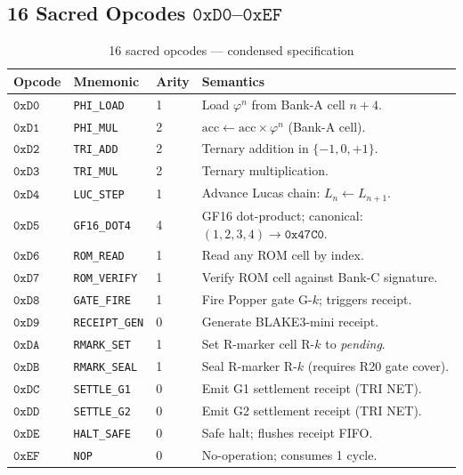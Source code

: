 \subsection{16 Sacred Opcodes $\mathtt{0xD0}$--$\mathtt{0xEF}$}
\label{sec74:opcodes}

\begin{table}[H]
\centering
\caption{16 sacred opcodes — condensed specification}
\label{tab74:opcodes}
\small
\begin{tabular}{lllp{6cm}}
\toprule
Opcode & Mnemonic & Arity & Semantics \\
\midrule
$\mathtt{0xD0}$ & \texttt{PHI\_LOAD}    & 1 & Load $\varphi^{n}$ from Bank-A cell $n+4$. \\
$\mathtt{0xD1}$ & \texttt{PHI\_MUL}     & 2 & $\mathrm{acc} \leftarrow \mathrm{acc} \times \varphi^{n}$ (Bank-A cell). \\
$\mathtt{0xD2}$ & \texttt{TRI\_ADD}     & 2 & Ternary addition in $\{-1,0,+1\}$. \\
$\mathtt{0xD3}$ & \texttt{TRI\_MUL}     & 2 & Ternary multiplication. \\
$\mathtt{0xD4}$ & \texttt{LUC\_STEP}    & 1 & Advance Lucas chain: $L_n \leftarrow L_{n+1}$. \\
$\mathtt{0xD5}$ & \texttt{GF16\_DOT4}   & 4 & GF16 dot-product; canonical: $(1,2,3,4)\to\mathtt{0x47C0}$. \\
$\mathtt{0xD6}$ & \texttt{ROM\_READ}    & 1 & Read any ROM cell by index. \\
$\mathtt{0xD7}$ & \texttt{ROM\_VERIFY}  & 1 & Verify ROM cell against Bank-C signature. \\
$\mathtt{0xD8}$ & \texttt{GATE\_FIRE}   & 1 & Fire Popper gate G-$k$; triggers receipt. \\
$\mathtt{0xD9}$ & \texttt{RECEIPT\_GEN} & 0 & Generate BLAKE3-mini receipt. \\
$\mathtt{0xDA}$ & \texttt{RMARK\_SET}   & 1 & Set R-marker cell R-$k$ to \textit{pending}. \\
$\mathtt{0xDB}$ & \texttt{RMARK\_SEAL}  & 1 & Seal R-marker R-$k$ (requires R20 gate cover). \\
$\mathtt{0xDC}$ & \texttt{SETTLE\_G1}   & 0 & Emit G1 settlement receipt (TRI NET). \\
$\mathtt{0xDD}$ & \texttt{SETTLE\_G2}   & 0 & Emit G2 settlement receipt (TRI NET). \\
$\mathtt{0xDE}$ & \texttt{HALT\_SAFE}   & 0 & Safe halt; flushes receipt FIFO. \\
$\mathtt{0xEF}$ & \texttt{NOP}          & 0 & No-operation; consumes 1 cycle. \\
\bottomrule
\end{tabular}
\end{table}

